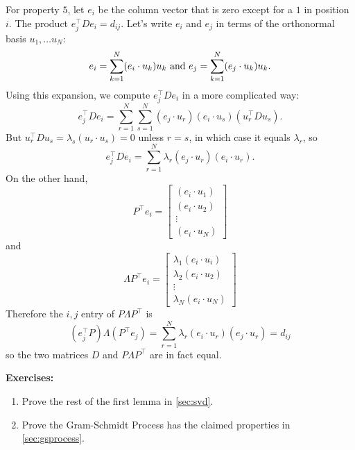\documentclass[
]{article}
\begin{document}
For property \(5\), let \(e_{i}\) be the column vector that is zero
except for a \(1\) in position \(i\). The product
\(e_{j}^{\intercal}De_{i}=d_{ij}\). Let's write \(e_{i}\) and \(e_{j}\)
in terms of the orthonormal basis \(u_{1},\ldots u_{N}\): \[
e_{i} = \sum_{k=1}^{N} (e_{i}\cdot u_{k})u_k \hbox{ and } e_{j} = \sum_{k=1}^{N}(e_{j}\cdot u_{k})u_{k}.
\] Using this expansion, we compute \(e_{j}^{\intercal}De_{i}\) in a
more complicated way: \[
e_{j}^{\intercal}De_{i} = \sum_{r=1}^{N}\sum_{s=1}^{N} (e_{j}\cdot u_{r})(e_{i}\cdot u_{s})(u_{r}^{\intercal}Du_{s}).
\] But \(u_{r}^{\intercal}Du_{s}=\lambda_{s}(u_{r}\cdot u_{s})=0\)
unless \(r=s\), in which case it equals \(\lambda_{r}\), so \[
e_{j}^{\intercal}De_{i} = \sum_{r=1}^{N} \lambda_{r}(e_{j}\cdot u_{r})(e_{i}\cdot u_{r}).
\] On the other hand, \[
P^{\intercal}e_{i} = \left[\begin{matrix} (e_{i}\cdot u_{1})\\ (e_{i}\cdot u_{2})\\ \vdots \\(e_{i}\cdot u_{N})\end{matrix}\right]
\] and \[
\Lambda P^{\intercal}e_{i} = \left[\begin{matrix} \lambda_{1}(e_{i}\cdot u_{i})\\ \lambda_{2}(e_{i}\cdot u_{2})\\ \vdots \\ \lambda_{N}(e_{i}\cdot u_{N})\end{matrix}\right]
\] Therefore the \(i,j\) entry of \(P\Lambda P^{\intercal}\) is \[
(e_{j}^{\intercal}P)\Lambda (P^{\intercal}e_{j}) = \sum_{r=1}^{N} \lambda_{r}(e_{i}\cdot u_{r})(e_{j}\cdot u_{r}) = d_{ij}
\] so the two matrices \(D\) and \(P\Lambda P^{\intercal}\) are in fact
equal.

\textbf{Exercises:}

\begin{enumerate}
\def\labelenumi{\arabic{enumi}.}
\item
  Prove the rest of the first lemma in \cref{sec:svd}.
\item
  Prove the Gram-Schmidt Process has the claimed properties in
  \cref{sec:gsprocess}.
\end{enumerate}
\end{document}
